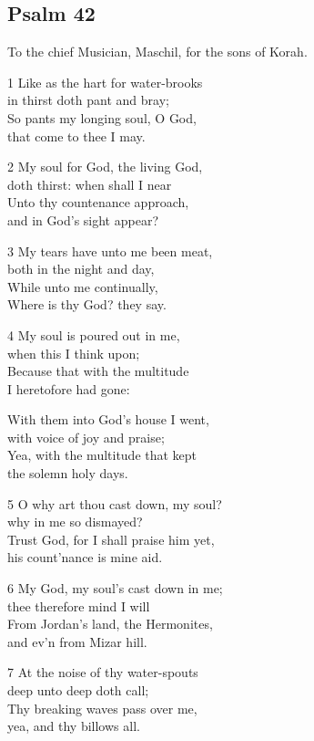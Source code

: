 \subsection*{Psalm 42}

To the chief Musician, Maschil, for the sons of Korah.

1 Like as the hart for water-brooks\\
in thirst doth pant and bray;\\
So pants my longing soul, O God,\\
that come to thee I may.

2 My soul for God, the living God,\\
doth thirst: when shall I near\\
Unto thy countenance approach,\\
and in God’s sight appear?

3 My tears have unto me been meat,\\
both in the night and day,\\
While unto me continually,\\
Where is thy God? they say.

4 My soul is poured out in me,\\
when this I think upon;\\
Because that with the multitude\\
I heretofore had gone:

With them into God’s house I went,\\
with voice of joy and praise;\\
Yea, with the multitude that kept\\
the solemn holy days.

5 O why art thou cast down, my soul?\\
why in me so dismayed?\\
Trust God, for I shall praise him yet,\\
his count’nance is mine aid.

6 My God, my soul’s cast down in me;\\
thee therefore mind I will\\
From Jordan’s land, the Hermonites,\\
and ev’n from Mizar hill.

7 At the noise of thy water-spouts\\
deep unto deep doth call;\\
Thy breaking waves pass over me,\\
yea, and thy billows all.

